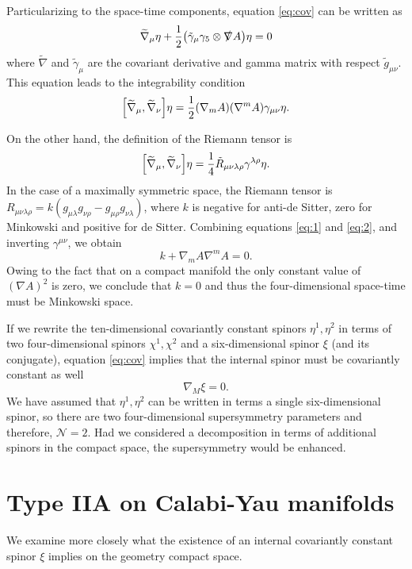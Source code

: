 Particularizing to the space-time components, equation \eqref{eq:cov} can be written as
\begin{equation}
  \widetilde{\nabla}_\mu \eta + \frac{1}{2}\qty(\tilde{\gamma}_\mu \gamma_5 \otimes \slashed \nabla A) \eta=0
\end{equation}
where $\widetilde{\nabla}$ and $\tilde \gamma_\mu$ are the covariant derivative and gamma matrix with respect $\tilde g_{\mu\nu}$.
This equation leads to the integrability condition
\begin{equation}
  \qty[\widetilde \nabla_\mu,\widetilde \nabla_\nu]\eta=\frac{1}{2}\qty(\nabla_m A)\qty(\nabla^m A)\gamma_{\mu\nu}\eta.
  \label{eq:1}
\end{equation}

On the other hand, the definition of the Riemann tensor is
\begin{equation}
  \qty[\widetilde \nabla_\mu,\widetilde \nabla_\nu]\eta=\frac{1}{4}\tilde R_{\mu\nu\lambda\rho} \gamma^{\lambda\rho}\eta.
  \label{eq:2}
\end{equation}
In the case of a maximally symmetric space, the Riemann tensor is $R_{\mu\nu\lambda\rho}=k(g_{\mu\lambda}g_{\nu\rho}-g_{\mu\rho}g_{\nu\lambda})$, where
$k$ is negative for anti-de Sitter, zero for Minkowski and positive for de Sitter.
Combining equations  \eqref{eq:1} and \eqref{eq:2}, and inverting $\gamma^{\mu\nu}$, we obtain 
\begin{equation}
  k + \nabla_m A \nabla^m A =0.
\end{equation}
Owing to the fact that on a compact manifold the only constant value of $(\nabla A)^2$ is zero,
we conclude that $k=0$ and thus the four-dimensional space-time must be Minkowski space.

If we rewrite the ten-dimensional covariantly constant spinors $\eta^1,\eta^2$ in terms of two four-dimensional 
spinors $\chi^1, \chi^2$ and a six-dimensional spinor $\xi$ (and its conjugate), equation \eqref{eq:cov} implies that the internal spinor must be
covariantly constant as well
\begin{equation}
  \nabla_M \xi=0.
\end{equation}
We have assumed that $\eta^1, \eta^2$ can be written in terms a single six-dimensional spinor, so there are two four-dimensional supersymmetry parameters and therefore, $\mathcal N =2$.
Had we considered a decomposition in terms of additional spinors in the compact space, the supersymmetry would be enhanced.

\section{Type IIA on Calabi-Yau manifolds}
We examine more closely what the existence of an internal covariantly constant spinor $\xi$ implies on the geometry compact space. 

